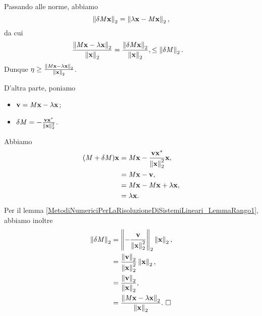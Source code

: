 Passando alle norme, abbiamo
\[
  \Norm{\Perturbation{\Matrix}\Eigenvector}[2]
  = \Norm{\Eigenvalue\Eigenvector - \Matrix\Eigenvector}[2],
\]
da cui
\begin{align*}
  \frac{\Norm{\Matrix\Eigenvector - \Eigenvalue\Eigenvector}[2]}
    {\Norm{\Eigenvector}[2]}
  &= \frac{\Norm{\Perturbation{\Matrix}\Eigenvector}[2]}
    {\Norm{\Eigenvector}[2]},
  \leq \Norm{\Perturbation{\Matrix}}[2].
\end{align*}
Dunque
$\BackwardError
\geq \frac{\Norm{\Matrix\Eigenvector - \Eigenvalue\Eigenvector}[2]}
{\Norm{\Eigenvector}[2]}$.
\par D'altra parte, poniamo
\begin{itemize}
  \item $\Vector = \Matrix\Eigenvector - \Eigenvalue\Eigenvector$;
  \item $\Perturbation{\Matrix}
    = - \frac{\Vector\HermitianTransposed{\Eigenvector}}
        {\Norm{\Eigenvector}[2]^2}$.
\end{itemize}
\par Abbiamo
\begin{align*}
  (\Matrix + \Perturbation{\Matrix})\Eigenvector
  &= \Matrix\Eigenvector
    - \frac{\Vector\HermitianTransposed{\Eigenvector}}
      {\Norm{\Eigenvector}[2]^2} \Eigenvector,\\
  &= \Matrix\Eigenvector - \Vector,\\
  &= \Matrix\Eigenvector - \Matrix\Eigenvector + \Eigenvalue\Eigenvector,\\
  &= \Eigenvalue\Eigenvector.
\end{align*}
Per il lemma
\ref{MetodiNumericiPerLaRisoluzioneDiSistemiLineari_LemmaRango1},
abbiamo inoltre
\begin{align*}
  \Norm{\Perturbation{\Matrix}}[2]
  &= \Norm{- \frac{\Vector}{\Norm{\Eigenvector}[2]^2}}[2] \Norm{\Eigenvector}[2],\\
  &= \frac{\Norm{\Vector}[2]}{\Norm{\Eigenvector}[2]^2} \Norm{\Eigenvector}[2],\\
  &= \frac{\Norm{\Vector}[2]}{\Norm{\Eigenvector}[2]},\\
  &= \frac{\Norm{\Matrix\Eigenvector - \Eigenvalue\Eigenvector}[2]}
    {\Norm{\Eigenvector}[2]}.\text{ \EndProof}
\end{align*}

